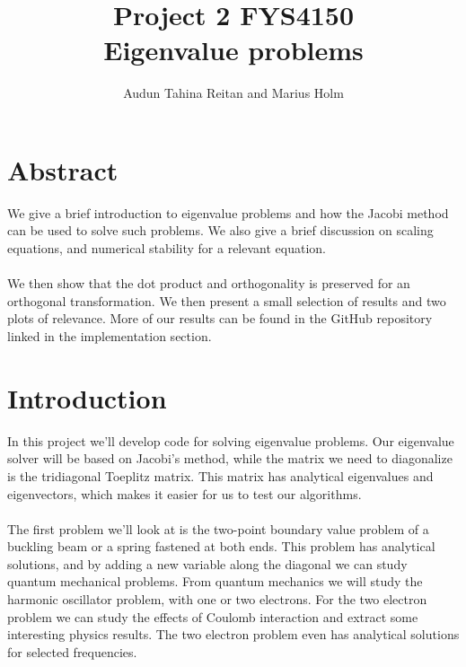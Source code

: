 \documentclass[a4paper, fontsize=11pt]{article}
\begin{document}
\title{Project 2 FYS4150 \\ Eigenvalue problems}
\author{Audun Tahina Reitan and Marius Holm}

\maketitle


\section{Abstract}
We give a brief introduction to eigenvalue problems and how the Jacobi method can be used to solve such problems. We also give a brief discussion on scaling equations, and numerical stability for a relevant equation.

\paragraph{}
We then show that the dot product and orthogonality is preserved for an orthogonal transformation. We then present a small selection of results and two plots of relevance. More of our results can be found in the GitHub repository linked in the implementation section. 


\section{Introduction}
In this project we'll develop code for solving eigenvalue problems. Our eigenvalue solver will be based on Jacobi's method, while the matrix we need to diagonalize is the tridiagonal Toeplitz matrix. This matrix has analytical eigenvalues and eigenvectors, which makes it easier for us to test our algorithms. 


\paragraph{}
The first problem we'll look at is the two-point boundary value problem of a buckling beam or a spring fastened at both ends. This problem has analytical solutions, and by adding a new variable along the diagonal we can study quantum mechanical problems. From quantum mechanics we will study the harmonic oscillator problem, with one or two electrons. For the two electron problem we can study the effects of Coulomb interaction and extract some interesting physics results.  The two electron problem even has analytical solutions for selected frequencies.\cite{PhysRevA.48.3561}
\end{document}
